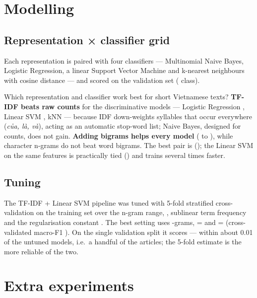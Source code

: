 \section{Modelling}\label{tx:models}
\subsection{Representation × classifier grid}
Each representation is paired with four classifiers — Multinomial Naive Bayes, Logistic Regression, a linear Support Vector
Machine and k-nearest neighbours with cosine distance — and scored on the validation set ( class).

\begin{table}[H]\centering\small
\caption{Validation macro-F1 for every representation × classifier pair (best in bold). A stratified random guess scores \TXRandomVal.}\label{tx:tab-grid}

\end{table}
\begin{finding}
\Q Which representation and classifier work best for short Vietnamese texts?
\F \textbf{TF-IDF beats raw counts} for the discriminative models — Logistic Regression \TXGainTfidfLr, Linear SVM
\TXGainTfidfSvm, kNN \TXGainTfidfKnn{} — because IDF down-weights syllables that occur everywhere (\textit{của, là, và}),
acting as an automatic stop-word list; Naive Bayes, designed for counts, does not gain. \textbf{Adding bigrams helps every
model} (\TXGainBiMin{} to \TXGainBiMax), while character n-grams do not beat word bigrams. The best pair is
\TXGridBest{} (\TXGridBestF); the Linear SVM on the same features is practically tied (\TXGBiSvm) and trains several times faster.
\end{finding}

\subsection{Tuning}
The TF-IDF + Linear SVM pipeline was tuned with 5-fold stratified cross-validation on the training set over the n-gram range,
, sublinear term frequency and the regularisation constant . The best setting uses
\TXBestNgram-grams,  = \TXBestMinDf{} and  = \TXBestC{} (cross-validated macro-F1 \TXCvF). On the single
validation split it scores \TXTunedVal{} — within about 0.01 of the untuned models, i.e.\ a handful of the \TXVal{} articles;
the 5-fold estimate is the more reliable of the two.

\section{Extra experiments}\label{tx:extra}
